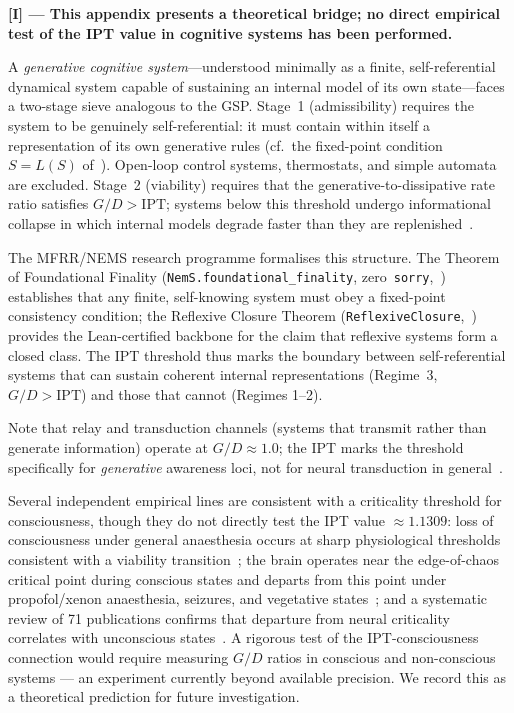 \documentclass[11pt]{article}
\theoremstyle{remark}
\newcommand{\IPT}{\mathrm{IPT}}
\newcommand{\lean}[1]{\texttt{#1}}
\begin{document}
\noindent\textbf{[I] --- This appendix presents a theoretical bridge; no direct empirical
test of the IPT value in cognitive systems has been performed.}

\smallskip
A \emph{generative cognitive system}---understood minimally as a finite,
self-referential dynamical system capable of sustaining an internal model
of its own state---faces a two-stage sieve analogous to the GSP.
Stage~1 (admissibility) requires the system to be genuinely self-referential:
it must contain within itself a representation of its own generative rules
(cf.\ the fixed-point condition $S = L(S)$ of~\cite{SpivackSelfDefiningUniverse}).
Open-loop control systems, thermostats, and simple automata are excluded.
Stage~2 (viability) requires that the generative-to-dissipative rate ratio
satisfies $G/D > \IPT$; systems below this threshold undergo informational
collapse in which internal models degrade faster than they are replenished~\cite{SpivackIPT}.

The MFRR/NEMS research programme formalises this structure.
The Theorem of Foundational Finality
(\lean{NemS.foundational\_finality}, zero~\lean{sorry},~\cite{SpivackNEMSHub})
establishes that any finite, self-knowing system must obey a fixed-point
consistency condition; the Reflexive Closure Theorem
(\lean{ReflexiveClosure},~\cite{SpivackNEMSHub}) provides the Lean-certified
backbone for the claim that reflexive systems form a closed class.
The IPT threshold thus marks the boundary between self-referential systems
that can sustain coherent internal representations (Regime~3, $G/D > \IPT$)
and those that cannot (Regimes 1--2).

Note that relay and transduction channels (systems that transmit rather than
generate information) operate at $G/D \approx 1.0$; the IPT marks the threshold
specifically for \emph{generative} awareness loci, not for neural transduction
in general~\cite{Tkacik2015,Shew2013}.

Several independent empirical lines are consistent with a criticality threshold
for consciousness, though they do not directly test the IPT value $\approx 1.1309$:
loss of consciousness under general anaesthesia occurs at sharp physiological
thresholds consistent with a viability transition~\cite{Tononi2008};
the brain operates near the edge-of-chaos critical point during conscious states
and departs from this point under propofol/xenon anaesthesia, seizures, and
vegetative states~\cite{Toker2022,Maschke2024};
and a systematic review of 71 publications confirms that departure from neural
criticality correlates with unconscious states~\cite{Wiesenhuetter2022}.
A rigorous test of the IPT-consciousness connection would require measuring
$G/D$ ratios in conscious and non-conscious systems --- an experiment
currently beyond available precision.
We record this as a theoretical prediction for future investigation.



\end{document}
